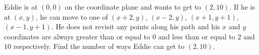 Eddie is at $(0,0)$ on the coordinate plane and wants to get to $(2,10)$. If he is at $(x,y)$, he can move to one of $(x+2,y)$, $(x-2,y)$, $(x+1,y+1)$, $(x-1,y+1)$. He does not revisit any points along his path and his $x$ and $y$ coordinates are always greater than or equal to $0$ and less than or equal to $2$ and $10$ respectively. Find the number of ways Eddie can get to $(2,10)$.

